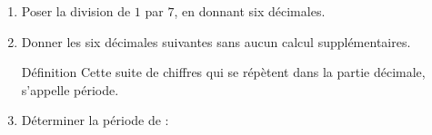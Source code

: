 \begin{exercice*}
    \begin{enumerate}
        \item Poser la division de $1$ par $7$, en donnant six décimales.
        \item Donner les six décimales suivantes sans aucun calcul supplémentaires.
        \begin{myBox}{ Définition}
            Cette suite de chiffres qui se répètent dans la partie décimale, s'appelle période.
        \end{myBox}
        \item Déterminer la période de :
        \begin{multicols}{2}
            \begin{enumerate}
            \end{enumerate}            
        \end{multicols}
    \end{enumerate}
\end{exercice*}
